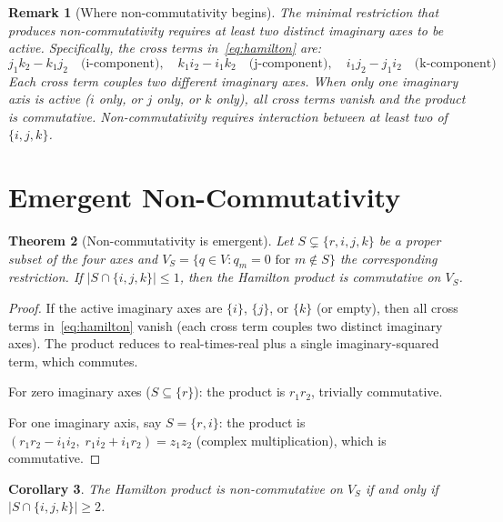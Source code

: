 \documentclass[11pt,a4paper]{article}
\newtheorem{theorem}{Theorem}
\newtheorem{corollary}[theorem]{Corollary}
\newtheorem{remark}[theorem]{Remark}
\begin{document}
\begin{remark}[Where non-commutativity begins]
The minimal restriction that produces non-commutativity requires at
least two distinct imaginary axes to be active. Specifically, the
cross terms in~\eqref{eq:hamilton} are:
\begin{equation}
j_1 k_2 - k_1 j_2 \quad\text{(i-component)}, \quad
k_1 i_2 - i_1 k_2 \quad\text{(j-component)}, \quad
i_1 j_2 - j_1 i_2 \quad\text{(k-component)}
\end{equation}
Each cross term couples \emph{two different} imaginary axes. When
only one imaginary axis is active ($i$ only, or $j$ only, or $k$ only),
all cross terms vanish and the product is commutative. Non-commutativity
requires interaction between at least two of $\{i, j, k\}$.
\end{remark}

\section{Emergent Non-Commutativity}
\label{sec:emergence}

\begin{theorem}[Non-commutativity is emergent]
\label{thm:emergence}
Let $S \subsetneq \{r, i, j, k\}$ be a proper subset of the four axes
and $V_S = \{q \in V : q_m = 0 \text{ for } m \notin S\}$ the
corresponding restriction. If $|S \cap \{i, j, k\}| \leq 1$, then
the Hamilton product is commutative on $V_S$.
\end{theorem}

\begin{proof}
If the active imaginary axes are $\{i\}$, $\{j\}$, or $\{k\}$ (or
empty), then all cross terms in~\eqref{eq:hamilton} vanish (each
cross term couples two distinct imaginary axes). The product reduces
to real-times-real plus a single imaginary-squared term, which
commutes.

For zero imaginary axes ($S \subseteq \{r\}$): the product is
$r_1 r_2$, trivially commutative.

For one imaginary axis, say $S = \{r, i\}$: the product is
$(r_1 r_2 - i_1 i_2, \; r_1 i_2 + i_1 r_2) = z_1 z_2$
(complex multiplication), which is commutative.
\end{proof}

\begin{corollary}
\label{cor:min-axes}
The Hamilton product is non-commutative on $V_S$ if and only if
$|S \cap \{i, j, k\}| \geq 2$.
\end{corollary}
\end{document}
